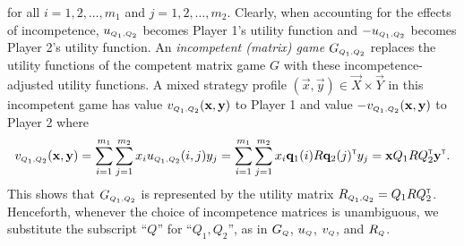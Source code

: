     for all $i = 1, 2, \ldots, m_1$ and $j = 1, 2, \ldots, m_2$.
    Clearly, when accounting for the effects of incompetence, $u_\ms{Q_1, Q_2}$ becomes Player 1's utility function and $-u_\ms{Q_1, Q_2}$ becomes Player 2's utility function.
    An \emph{incompetent (matrix) game} $G_\ms{Q_1, Q_2}$ replaces the utility functions of the competent matrix game $G$ with these incompetence-adjusted utility functions.
    A mixed strategy profile $(\vec{x}, \vec{y}) \in \vec{X} \times \vec{Y}$ in this incompetent game has value $v_\ms{Q_1, Q_2}(\vec{x}, \vec{y})$ to Player 1 and value $-v_\ms{Q_1, Q_2}(\vec{x}, \vec{y})$ to Player 2 where
    \begin{equation} \label{eq:incompetent-expected-utility}
        v_\ms{Q_1, Q_2}(\vec{x}, \vec{y})
            = \sum_{i = 1}^{m_1} \sum_{j = 1}^{m_2} x_i u_\ms{Q_1, Q_2}(i, j) y_j
            = \sum_{i = 1}^{m_1} \sum_{j = 1}^{m_2} x_i \vec{q}_1(i) R \vec{q}_2(j)^\transp y_j
            = \vec{x} Q_1 R Q_2^\transp \vec{y}^\transp.
    \end{equation}
    This shows that $G_\ms{Q_1, Q_2}$ is represented by the utility matrix $R_\ms{Q_1, Q_2} = Q_1 R Q_2^\transp$.
    Henceforth, whenever the choice of incompetence matrices is unambiguous, we substitute the subscript ``$Q$'' for ``$Q_1, Q_2$'', as in $G_\ms{Q}$, $u_\ms{Q}$, $v_\ms{Q}$, and $R_\ms{Q}$.

